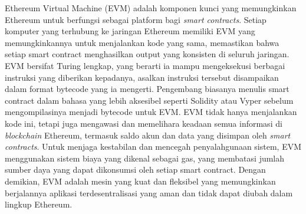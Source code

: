 Ethereum Virtual Machine (EVM) adalah komponen kunci yang memungkinkan Ethereum untuk berfungsi sebagai platform bagi \emph{smart contracts}. Setiap komputer yang terhubung ke jaringan Ethereum memiliki EVM yang memungkinkannya untuk menjalankan kode yang sama, memastikan bahwa setiap smart contract menghasilkan output yang konsisten di seluruh jaringan. EVM bersifat Turing lengkap, yang berarti ia mampu mengeksekusi berbagai instruksi yang diberikan kepadanya, asalkan instruksi tersebut disampaikan dalam format bytecode yang ia mengerti. Pengembang biasanya menulis smart contract dalam bahasa yang lebih aksesibel seperti Solidity atau Vyper sebelum mengompilasinya menjadi bytecode untuk EVM. EVM tidak hanya menjalankan kode ini, tetapi juga mengawasi dan memelihara keadaan semua informasi di \emph{blockchain} Ethereum, termasuk saldo akun dan data yang disimpan oleh \emph{smart contracts}. Untuk menjaga kestabilan dan mencegah penyalahgunaan sistem, EVM menggunakan sistem biaya yang dikenal sebagai gas, yang membatasi jumlah sumber daya yang dapat dikonsumsi oleh setiap smart contract. Dengan demikian, EVM adalah mesin yang kuat dan fleksibel yang memungkinkan berjalannya aplikasi terdesentralisasi yang aman dan tidak dapat diubah dalam lingkup Ethereum. \cite{Dannen2017}

